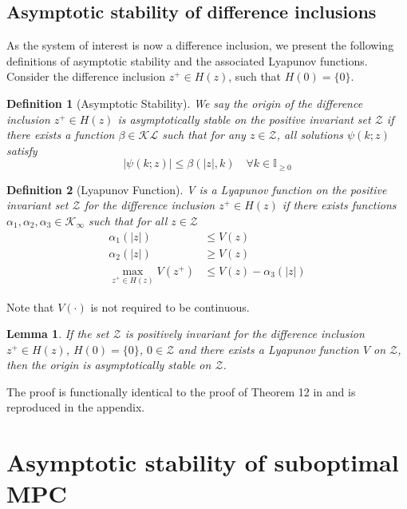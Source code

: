 \documentclass{article}
\newtheorem{definition}{Definition}
\newtheorem{lemma}{Lemma}
\newcommand{\abs}[1]{\left\lvert #1 \right\rvert}
\begin{document}
\subsection{Asymptotic stability of difference inclusions}
As the system of interest is now a difference inclusion, we present the 
following definitions of asymptotic stability and the associated Lyapunov
functions. Consider the difference inclusion $z^+ \in H(z)$, such that $H(0) =
\{0\}$.
\begin{definition}[Asymptotic Stability]
\label{def:as}
We say the origin of the difference inclusion $z^+ \in H(z)$ is 
asymptotically stable on the positive invariant set $\mathcal{Z}$ if there exists a function
$\beta \in \mathcal{KL}$ such that for any $z \in \mathcal{Z}$, all solutions
$\psi(k;z)$ satisfy
\begin{equation*}
\abs{\psi(k;z)} \leq \beta(\abs{z},k) \quad \forall k \in \mathbb{I}_{\geq 0}
\end{equation*}
\end{definition}
\begin{definition}[Lyapunov Function]
\label{def:lyap}
V is a Lyapunov function on the positive invariant set $\mathcal{Z}$ for the difference 
inclusion $z^+ \in H(z)$ if there exists functions $\alpha_1,\alpha_2,\alpha_3
\in \mathcal{K}_\infty$ such that for all $z \in \mathcal{Z}$
\begin{align}
\label{eq:lowerlyap}
\alpha_1(\abs{z}) &\leq V(z) \\
\label{eq:upperlyap}
\alpha_2(\abs{z}) &\geq V(z) \\
\label{eq:decreaselyap}
\max_{z^+ \in H(z)} V(z^+) &\leq V(z) - \alpha_3(\abs{z})
\end{align}
\end{definition}
Note that $V(\cdot)$ is not required to be continuous.
\begin{lemma}
\label{lem:stab}
If the set $\mathcal{Z}$ is positively invariant for the difference 
inclusion $z^+ \in H(z)$, $H(0) = \{0\}$, $0 \in \mathcal{Z}$ 
and there exists a Lyapunov function $V$ on $\mathcal{Z}$, then the 
origin is asymptotically stable on $\mathcal{Z}$.
\end{lemma}
The proof is functionally identical to the proof of Theorem 12 in \citep{rawlings:mayne:2011} and is
reproduced in the appendix.

\section{Asymptotic stability of suboptimal MPC}
\end{document}
